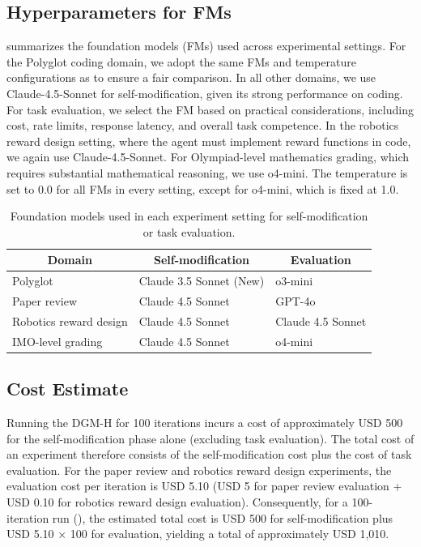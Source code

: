 \documentclass[]{fairmeta}
\begin{document}
\subsection{Hyperparameters for FMs}
\label{app:fm-hyperparam}

 summarizes the foundation models (FMs) used across experimental settings. For the Polyglot coding domain, we adopt the same FMs and temperature configurations as \citet{zhang2025darwin} to ensure a fair comparison. In all other domains, we use Claude-4.5-Sonnet for self-modification, given its strong performance on coding. For task evaluation, we select the FM based on practical considerations, including cost, rate limits, response latency, and overall task competence. In the robotics reward design setting, where the agent must implement reward functions in code, we again use Claude-4.5-Sonnet. For Olympiad-level mathematics grading, which requires substantial mathematical reasoning, we use o4-mini. The temperature is set to 0.0 for all FMs in every setting, except for o4-mini, which is fixed at 1.0.

\begin{table}[H]
\centering
\caption{Foundation models used in each experiment setting for self-modification or task evaluation.}
\label{tab:fm-hyperparam}
\begin{tabular}{@{}lll@{}}
\toprule
\multicolumn{1}{c}{\textbf{Domain}} & \multicolumn{1}{c}{\textbf{Self-modification}} & \multicolumn{1}{c}{\textbf{Evaluation}} \\ \midrule
Polyglot & Claude 3.5 Sonnet (New) & o3-mini \\
Paper review & Claude 4.5 Sonnet & GPT-4o \\
Robotics reward design & Claude 4.5 Sonnet & Claude 4.5 Sonnet \\
IMO-level grading & Claude 4.5 Sonnet & o4-mini \\ \bottomrule
\end{tabular}
\end{table}

\subsection{Cost Estimate}
\label{app:cost-estimate}

Running the DGM-H for 100 iterations incurs a cost of approximately USD 500 for the self-modification phase alone (excluding task evaluation). The total cost of an experiment therefore consists of the self-modification cost plus the cost of task evaluation. For the paper review and robotics reward design experiments, the evaluation cost per iteration is USD 5.10 (USD 5 for paper review evaluation + USD 0.10 for robotics reward design evaluation). Consequently, for a 100-iteration run (), the estimated total cost is USD 500 for self-modification plus USD 5.10 × 100 for evaluation, yielding a total of approximately USD 1,010.
\end{document}
